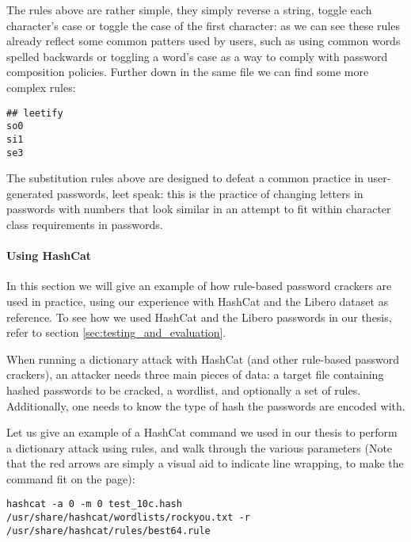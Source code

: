 The rules above are rather simple, they simply reverse a string, toggle each character's case or toggle the case of the first character: as we can see these rules already reflect some common patters used by users, such as using common words spelled backwards or toggling a word's case as a way to comply with password composition policies.
\clearpage
Further down in the same file we can find some more complex rules:
\begin{verbatim}
## leetify
so0
si1
se3
\end{verbatim}

The substitution rules above are designed to defeat a common practice in user-generated passwords, leet speak: this is the practice of changing letters in passwords with numbers that look similar in an attempt to fit within character class requirements in passwords. 

\paragraph{Using HashCat}
In this section we will give an example of how rule-based password crackers are used in practice, using our experience with HashCat and the Libero dataset as reference. To see how we used HashCat and the Libero passwords in our thesis, refer to section \ref{sec:testing_and_evaluation}.

When running a dictionary attack with HashCat (and other rule-based password crackers), an attacker needs three main pieces of data: a target file containing hashed passwords to be cracked, a wordlist, and optionally a set of rules.
Additionally, one needs to know the type of hash the passwords are encoded with.

Let us give an example of a HashCat command we used in our thesis to perform a dictionary attack using rules, and walk through the various parameters (Note that the red arrows are simply a visual aid to indicate line wrapping, to make the command fit on the page):

\begin{lstlisting}[breaklines=true,postbreak=\mbox{\textcolor{red}{$\hookrightarrow$}\space}]
hashcat -a 0 -m 0 test_10c.hash /usr/share/hashcat/wordlists/rockyou.txt -r /usr/share/hashcat/rules/best64.rule
\end{lstlisting}

